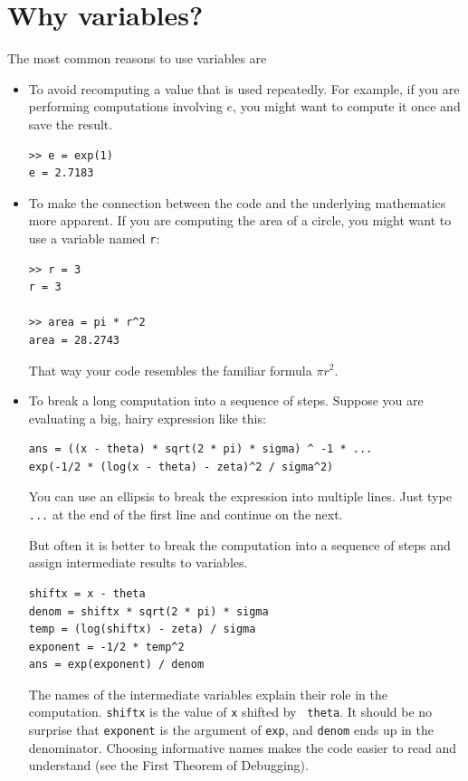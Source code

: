\documentclass{book}
\begin{document}
\section{Why variables?}

The most common reasons to use variables are

\begin{itemize}

\item To avoid recomputing a value that is used repeatedly.  For
example, if you are performing computations involving $e$, you might
want to compute it once and save the result.

\begin{verbatim}
>> e = exp(1)
e = 2.7183
\end{verbatim}


\item To make the connection between the code and the underlying
mathematics more apparent.  If you are computing the area of a circle,
you might want to use a variable named {\tt r}:

\begin{verbatim}
>> r = 3
r = 3

>> area = pi * r^2
area = 28.2743
\end{verbatim}

That way your code resembles the familiar formula $\pi r^2$.

\item To break a long computation into a sequence of steps.
Suppose you are evaluating a big, hairy expression like this:

\begin{verbatim}
ans = ((x - theta) * sqrt(2 * pi) * sigma) ^ -1 * ...
exp(-1/2 * (log(x - theta) - zeta)^2 / sigma^2)
\end{verbatim}

You can use an ellipsis to break the expression into multiple lines.
Just type {\tt ...} at the end of the first line and continue on the
next.

But often it is better to break the computation into a sequence of
steps and assign intermediate results to variables.

\begin{verbatim}
shiftx = x - theta
denom = shiftx * sqrt(2 * pi) * sigma
temp = (log(shiftx) - zeta) / sigma
exponent = -1/2 * temp^2
ans = exp(exponent) / denom
\end{verbatim}

The names of the intermediate variables explain their role in the
computation.  {\tt shiftx} is the value of {\tt x} shifted by {\tt
theta}.  It should be no surprise that {\tt exponent} is the argument
of {\tt exp}, and {\tt denom} ends up in the denominator.  Choosing
informative names makes the code easier to read and understand (see
the First Theorem of Debugging).

\end{itemize}
\end{document}
